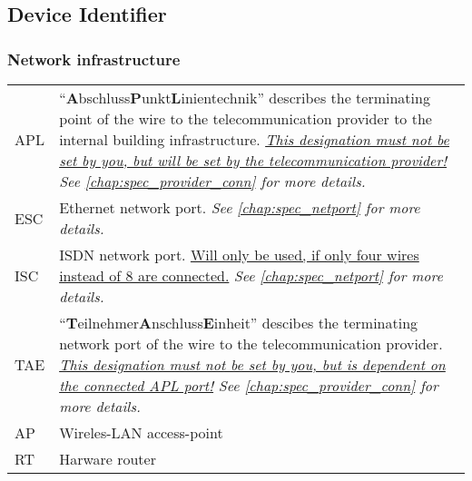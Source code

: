 %
%
%
%
%
%
%

\subsection{Device Identifier}
\label{chap:con_dev-identify}


\subsubsection{Network infrastructure}

\renewcommand{\arraystretch}{1.2}
\begin{tabular}{p{1.4cm}p{15cm}}
	APL	& ``\textbf{A}bschluss\textbf{P}unkt\textbf{L}inientechnik'' describes
		the terminating point of the wire to the telecommunication provider to
		the internal building infrastructure. \textit{\underline{This
		designation must not be set by you, but will be set by the
		telecommunication provider!} See \ref{chap:spec_provider_conn} for more
		details.} \\

	ESC & Ethernet network port. \textit{See \ref{chap:spec_netport} for more
		details.} \\

	ISC & ISDN network port. \underline{Will only be used, if only four wires
		instead of 8 are connected.} \textit{See \ref{chap:spec_netport} for
		more details.} \\

	TAE & ``\textbf{T}eilnehmer\textbf{A}nschluss\textbf{E}inheit'' descibes the
		terminating network port of the wire to the telecommunication provider.
		\textit{\underline{This designation must not be set by you, but is
		dependent on the connected APL port!} See \ref{chap:spec_provider_conn}
		for more details.} \\

	AP	& Wireles-LAN access-point \\

	RT	& Harware router \\
\end{tabular}



